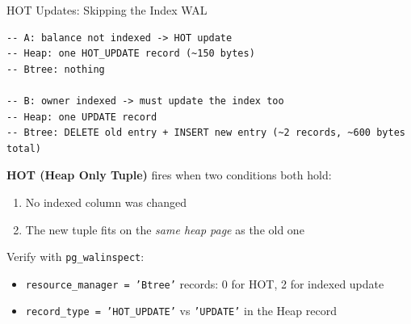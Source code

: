 \documentclass[aspectratio=169,10pt]{beamer}
\begin{document}
\begin{frame}[fragile]{HOT Updates: Skipping the Index WAL}

\begin{lstlisting}[style=ascii]
-- A: balance not indexed -> HOT update
-- Heap: one HOT_UPDATE record (~150 bytes)
-- Btree: nothing

-- B: owner indexed -> must update the index too
-- Heap: one UPDATE record
-- Btree: DELETE old entry + INSERT new entry (~2 records, ~600 bytes total)
\end{lstlisting}

  \vspace{0.5em}
  \textbf{HOT (Heap Only Tuple)} fires when two conditions both hold:
  \begin{enumerate}\small
    \item No indexed column was changed
    \item The new tuple fits on the \textit{same heap page} as the old one
  \end{enumerate}

  \vspace{0.3em}
  Verify with \texttt{pg\_walinspect}:
  \begin{itemize}\small
    \item \texttt{resource\_manager = 'Btree'} records: 0 for HOT, 2 for indexed update
    \item \texttt{record\_type = 'HOT\_UPDATE'} vs \texttt{'UPDATE'} in the Heap record
  \end{itemize}

\end{frame}
\end{document}
